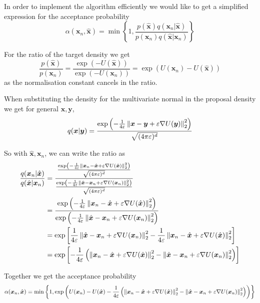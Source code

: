In order to implement the algorithm efficiently we would like to get a simplified expression for the acceptance probability
\[
	\alpha( \bm{x}_n, \hat{\bm{x}} ) 
	= \min \left \{ 1, \frac
		{ p(\hat{\bm{x}}) q( \bm{x}_n | \hat{\bm{x}} )  } 
		{ p(\bm{x}_n) q( \hat{\bm{x}} | \bm{x}_n ) }
	\right\}
\]

For the ratio of the target density we get
\[
	\frac{ p(\hat{\bm{x}}) }{ p(\bm{x}_n) } = \frac{ \exp(-U(\hat{\bm{x}})) }{ \exp(-U(\bm{x}_n)) } = \exp( U(\bm{x}_n) - U(\hat{\bm{x}}) )
\]
as the normalisation constant cancels in the ratio.

When substituting the density for the multivariate normal in the proposal density we get for general $\bm{x}, \bm{y}$,
\[
	q(\bm{x} | \bm{y}) 
	= \frac
		{ \exp \left( -\frac{1}{4\varepsilon} \left\lVert\bm{x} - \bm{y} + \varepsilon \nabla U( \bm{y} ) \right\rVert_{2}^2 \right) }
		{ \sqrt{(4\pi \varepsilon)^d } }
\]

So with $\hat{\bm{x}}, \bm{x}_n$, we can write the ratio as
\[
\begin{aligned}
	\frac{ q(\bm{x}_n | \hat{\bm{x}}) }{ q(\hat{\bm{x}} | \bm{x}_n) }
	&= \frac
		{
			\frac
			{ \exp \left( -\frac{1}{4\varepsilon} \left\lVert\bm{x}_n - \hat{\bm{x}} + \varepsilon \nabla U( \hat{\bm{x}} ) \right\rVert_{2}^2 \right) }
			{ \sqrt{(4\pi \varepsilon)^d } }
		}
		{
			\frac
			{ \exp \left( -\frac{1}{4\varepsilon} \left\lVert\hat{\bm{x}} - \bm{x}_n + \varepsilon \nabla U( \bm{x}_n ) \right\rVert_{2}^2 \right) }
			{ \sqrt{(4\pi \varepsilon)^d } }
		} \\
	&= \frac
		{
			\exp \left( -\frac{1}{4\varepsilon}  \left\lVert\bm{x}_n - \hat{\bm{x}} + \varepsilon \nabla U( \hat{\bm{x}} ) \right\rVert_{2}^2\right)
		}
		{
			\exp \left( -\frac{1}{4\varepsilon} \left\lVert\hat{\bm{x}} - \bm{x}_n + \varepsilon \nabla U( \bm{x}_n ) \right\rVert_{2}^2 \right) 
		} \\
	&= \exp 
		\left[ 
			\frac{1}{4\varepsilon} \left\lVert\hat{\bm{x}} - \bm{x}_n + \varepsilon \nabla U( \bm{x}_n ) \right\rVert_{2}^2 
			-\frac{1}{4\varepsilon} \left\lVert\bm{x}_n - \hat{\bm{x}} + \varepsilon \nabla U( \hat{\bm{x}} ) \right\rVert_{2}^2 
		\right] \\
	&= \exp 
		\left[ 
			-\frac{1}{4\varepsilon} 
			\left( \left\lVert\bm{x}_n - \hat{\bm{x}} + \varepsilon \nabla U( \hat{\bm{x}} ) \right\rVert_{2}^2 - \left\lVert\hat{\bm{x}} - \bm{x}_n + \varepsilon \nabla U( \bm{x}_n ) \right\rVert_{2}^2  \right) 
		\right] \\
\end{aligned}
\]

Together we get the acceptance probability
\[
	\alpha( \bm{x}_n, \hat{\bm{x}} ) 
	= \min \left \{ 1, \exp \left(
		U(\bm{x}_n) - U(\hat{\bm{x}})
		-\frac{1}{4\varepsilon} 
		\left( \left\lVert\bm{x}_n - \hat{\bm{x}} + \varepsilon \nabla U( \hat{\bm{x}} ) \right\rVert_{2}^2 - \left\lVert\hat{\bm{x}} - \bm{x}_n + \varepsilon \nabla U( \bm{x}_n ) \right\rVert_{2}^2  \right)
		\right) 
	\right\}
\]








